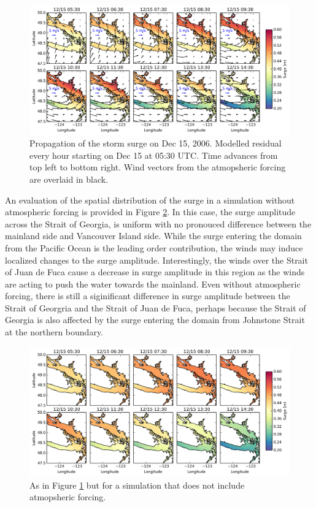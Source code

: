 \documentclass[pdftex,10pt]{article}
\begin{document}
\begin{figure}
\centering
\includegraphics[scale=0.6]{Figures/dec2006_spatial.pdf}
\caption{Propagation of the storm surge on Dec 15, 2006. Modelled residual every hour starting on Dec 15 at 05:30 UTC. Time advances from top left to bottom right. Wind vectors from the atmopsheric forcing are overlaid in black.}
\label{fig:spatial}
\end{figure}

An evaluation of the spatial distribution of the surge in a simulation without atmospheric forcing is provided in Figure \ref{fig:spatial_sshonly}. In this case, the surge amplitude across the Strait of Georgia, is uniform with no pronouced difference between the mainland side and Vancouver Island side. While the surge entering the domain from the Pacific Ocean is the leading order contribution, the winds may induce localized changes to the surge amplitude. Interestingly, the winds over the Strait of Juan de Fuca cause a decrease in surge amplitude in this region as the winds are acting to push the water towards the mainland.  Even without atmospheric forcing, there is still a siginificant difference in surge amplitude between the Strait of Georgria and the Strait of Juan de Fuca, perhaps because the Strait of Georgia is also affected by the surge entering the domain from Johnstone Strait at the northern boundary.

\begin{figure}
\centering
\includegraphics[scale=0.6]{Figures/dec2006_spatial_sshonly.pdf}
\caption{As in Figure \ref{fig:spatial} but for a simulation that does not include atmopsheric forcing. }
\label{fig:spatial_sshonly}
\end{figure}
\end{document}
